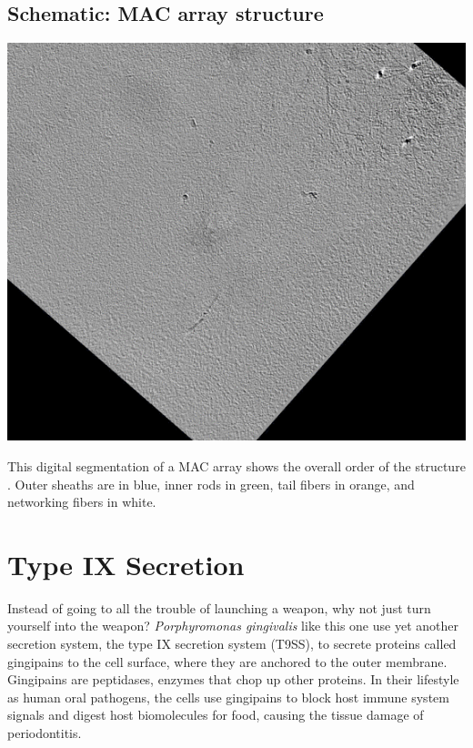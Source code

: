 \documentclass[]{tufte-book}
\begin{document}
\hypertarget{MAC_array_structure}{\subsection*{Schematic: MAC array
structure}\label{MAC_array_structure}}

\includegraphics{img/schematics/9_7_2}

This digital segmentation of a MAC array shows the overall order of the
structure \citep{shikuma2014}. Outer sheaths are in blue, inner rods in
green, tail fibers in orange, and networking fibers in white.

\section{Type IX Secretion}\label{type-ix-secretion}

Instead of going to all the trouble of launching a weapon, why not just
turn yourself into the weapon? \emph{Porphyromonas gingivalis} like this
one use yet another secretion system, the type IX secretion system
(T9SS), to secrete proteins called gingipains to the cell surface, where
they are anchored to the outer membrane. Gingipains are peptidases,
enzymes that chop up other proteins. In their lifestyle as human oral
pathogens, the cells use gingipains to block host immune system signals
and digest host biomolecules for food, causing the tissue damage of
periodontitis.
\end{document}
